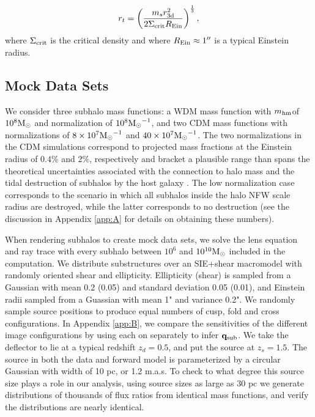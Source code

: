 \begin{equation} 
\label{eqn:truncrad}
r_t = \left(\frac{m_{s} r_{\rm{3d}}^2}{2 \Sigma_{\rm{crit}} R_{\rm{Ein}}}\right)^{\frac{1}{3}},
\end{equation}
where $\Sigma_{\rm{crit}}$ is the critical density and where $R_{\rm{Ein}} \approx 1''$ is a typical Einstein radius. 

\subsection{Mock Data Sets}
\label{ssec:mockdata}
We consider three subhalo mass functions: a WDM mass function with $m_{\rm{hm}}$of $10^8 {\rm{M}_{\odot}}$ and normalization of $10^8 {\rm{M}_{\odot}}^{-1}$, and two CDM mass functions with normalizations of $8\times 10^7 {\rm{M}_{\odot}}^{-1}$ and $40 \times 10^7 {\rm{M}_{\odot}}^{-1}$. The two normalizations in the CDM simulations correspond to projected mass fractions at the Einstein radius of $0.4\%$ and $2\%$, respectively and bracket a plausible range than spans the theoretical uncertainties associated with the connection to halo mass \citep{JiangvdB17} and the tidal destruction of subhalos by the host galaxy \citep{DespVeg16,GK++17}. The low normalization case corresponds to the scenario in which all subhalos inside the halo NFW scale radius are destroyed, while the latter corresponds to no destruction (see the discussion in Appendix \ref{app:A} for details on obtaining these numbers).

When rendering subhalos to create mock data sets, we solve the lens equation and ray trace with every subhalo between $10^6$ and $10^{10} {\rm{M}_{\odot}}$ included in the computation. We distribute substructures over an SIE+shear macromodel with randomly oriented shear and ellipticity. Ellipticity (shear) is sampled from a Gaussian with mean 0.2 (0.05) and standard deviation 0.05 (0.01), and Einstein radii sampled from a Guassian with mean 1" and variance 0.2". We randomly sample source positions to produce equal numbers of cusp, fold and cross configurations. In Appendix \ref{app:B}, we %
compare the sensitivities of the different image configurations by using each on separately to infer ${\bf{q}_{\rm{sub}}}$. We take the deflector to lie at a typical redshift $z_d = 0.5$, and put the source at $z_s = 1.5$. The source in both the data and forward model is parameterized by a circular Gaussian with width of 10 pc, or 1.2 m.a.s. To check to what degree this source size plays a role in our analysis, using source sizes as large as 30 pc we generate distributions of thousands of flux ratios from identical mass functions, and verify the distributions are nearly identical. 

